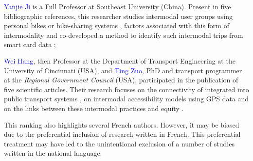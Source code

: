 \begin{refsegment}
\begin{customitemize}
        \item \textcolor{blue}{Yanjie Ji} is a Full Professor at Southeast University (China). Present in five bibliographic references, this researcher studies intermodal user groups using personal bikes or bike-sharing systems \textcolor{blue}{\autocite{ji_public_2017}}, factors associated with this form of intermodality \textcolor{blue}{\autocite{ji_exploring_2018, liu_use_2020, liu_understanding_2020}} and co-developed a method to identify such intermodal trips from smart card data \textcolor{blue}{\autocite{ma_understanding_2018}};
        \item \textcolor{blue}{Wei Hang}, then Professor at the Department of Transport Engineering at the University of Cincinnati (USA), and \textcolor{blue}{Ting Zuo}, PhD and transport programmer at the \textsl{Regional Government Council} (USA), participated in the publication of five scientific articles. Their research focuses on the connectivity of  integrated into public transport systems \textcolor{blue}{\autocite{zuo_bikeway_2019, zuo_incorporating_2021}}, on intermodal accessibility models \textcolor{blue}{\autocite{zuo_promote_2020}} using \acrfull{GPS} data \textcolor{blue}{\autocite{zuo_determining_2018}} and on the links between these intermodal practices and equity \textcolor{blue}{\autocite{zuo_first-and-last_2020}}.
    \end{customitemize}%

This ranking also highlights several French authors. However, it may be biased due to the preferential inclusion of research written in French. This preferential treatment may have led to the unintentional exclusion of a number of studies written in the national language.%


\end{refsegment}
